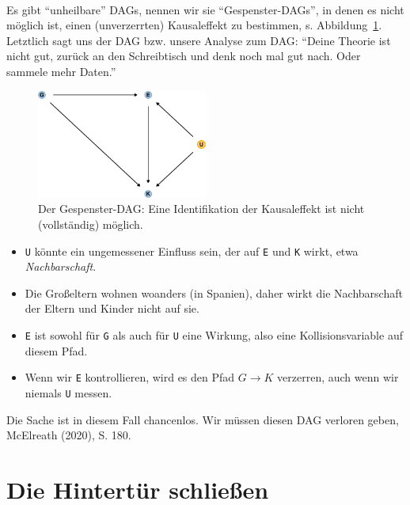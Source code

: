 \documentclass[
  a4paper,
  DIV=11]{scrreprt}
\theoremstyle{definition}
\theoremstyle{remark}
\begin{document}
👻

Es gibt ``unheilbare'' DAGs, nennen wir sie ``Gespenster-DAGs'', in
denen es nicht möglich ist, einen (unverzerrten) Kausaleffekt zu
bestimmen, s. Abbildung~\ref{fig-dag-ghost}. Letztlich sagt uns der DAG
bzw. unsere Analyse zum DAG: ``Deine Theorie ist nicht gut, zurück an
den Schreibtisch und denk noch mal gut nach. Oder sammele mehr Daten.''

\begin{figure}

{\centering \includegraphics[width=0.5\textwidth,height=\textheight]{./kausal_files/figure-pdf/fig-dag-ghost-1.pdf}

}

\caption{\label{fig-dag-ghost}Der Gespenster-DAG: Eine Identifikation
der Kausaleffekt ist nicht (vollständig) möglich.}

\end{figure}

\begin{itemize}
\item
  \texttt{U} könnte ein ungemessener Einfluss sein, der auf \texttt{E}
  und \texttt{K} wirkt, etwa \emph{Nachbarschaft}.
\item
  Die Großeltern wohnen woanders (in Spanien), daher wirkt die
  Nachbarschaft der Eltern und Kinder nicht auf sie.
\item
  \texttt{E} ist sowohl für \texttt{G} als auch für \texttt{U} eine
  Wirkung, also eine Kollisionsvariable auf diesem Pfad.
\item
  Wenn wir \texttt{E} kontrollieren, wird es den Pfad
  \(G \rightarrow K\) verzerren, auch wenn wir niemals \texttt{U}
  messen.
\end{itemize}

Die Sache ist in diesem Fall chancenlos. Wir müssen diesen DAG verloren
geben, McElreath (2020), S. 180.

\hypertarget{die-hintertuxfcr-schlieuxdfen}{%
\section{Die Hintertür schließen}\label{die-hintertuxfcr-schlieuxdfen}}
\end{document}
